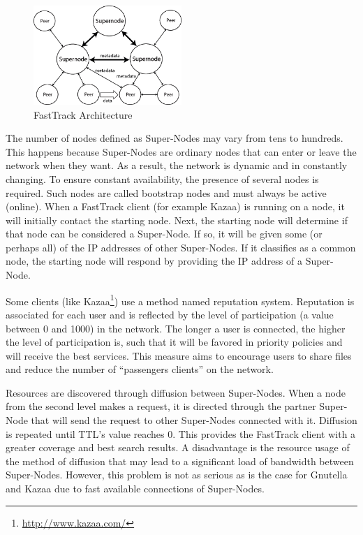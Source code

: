 \begin{figure}
  \centering
  \includegraphics[width=0.5\textwidth]{src/img/p2p-systems/fasttrack}
  \caption{FastTrack Architecture}
  \label{fig:p2p-systems:fasttrack}
\end{figure}

The number of nodes defined as Super-Nodes may vary from tens to hundreds.
This happens because Super-Nodes are ordinary nodes that can enter or leave the
network when they want. As a result, the network is dynamic and in constantly
changing. To ensure constant availability, the presence of several nodes is
required. Such nodes are called bootstrap nodes and must always be active
(online). When a FastTrack client (for example Kazaa) is running on a node, it
will initially contact the starting node. Next, the starting node will
determine if that node can be considered a Super-Node. If so, it will be given
some (or perhaps all) of the IP addresses of other Super-Nodes. If it
classifies as a common node, the starting node will respond by providing
the IP address of a Super-Node.

Some clients (like Kazaa\footnote{\url{http://www.kazaa.com/}}) use a method named reputation system. Reputation is
associated for each user and is reflected by the level of participation (a value
between 0 and 1000) in the network. The longer a user is connected, the higher
the level of participation is, such that it will be favored in priority
policies and will receive the best services. This measure aims to encourage
users to share files and reduce the number of ``passengers clients'' on the
network.

Resources are discovered through diffusion between Super-Nodes. When a node
from the second level makes a request, it is directed through the partner
Super-Node that will send the request to other Super-Nodes connected with it.
Diffusion is repeated until TTL's value reaches 0. This provides the FastTrack
client with a greater coverage and best search results. A disadvantage is the
resource usage of the method of diffusion that may lead to a significant load
of bandwidth between Super-Nodes. However, this problem is not as serious as
is the case for Gnutella and Kazaa due to fast available connections of
Super-Nodes.

